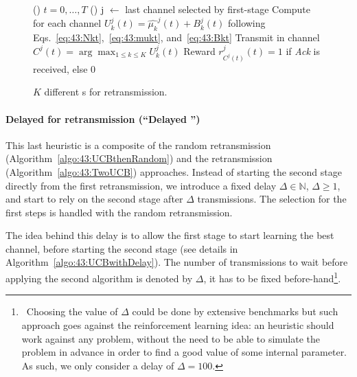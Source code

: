\vspace*{-3pt}
	\begin{figure}[h!]
		\centering
		\begin{algorithm}[H]
			\For()
			{$t = 0, \dots, T$}{
				\Else(){ %
					j $\leftarrow$ last channel selected by first-stage \UCB\;
					Compute for each channel $U_k^j(t) = \widehat{\mu_k}^j(t) + B_k^j(t)$ following Eqs.~\eqref{eq:43:Nkt},~\eqref{eq:43:mukt}, and~\eqref{eq:43:Bkt}\;
					Transmit in channel $C^j(t) = \arg\max_{1\leq k \leq K} U^j_k(t)$\;
					Reward $r^j_{C^j(t)}(t) = 1$ if \emph{Ack} is received, else $0$\;
				}
			}
			\caption{$K$ different {\UCB}s for retransmission.}
			\label{algo:43:UCBthenKp1}
		\end{algorithm}
	\end{figure}

\paragraph{Delayed \UCB{} for retransmission (``Delayed \UCB{}'')}\label{sub:43:UCBwithDelay}

This last heuristic is a composite of
the random retransmission (Algorithm~\ref{algo:43:UCBthenRandom})
and the \UCB{} retransmission (Algorithm~\ref{algo:43:TwoUCB}) approaches.
Instead of starting the second stage \UCB{} directly from the first retransmission, we introduce a fixed delay $\Delta\in\mathbb{N}$, $\Delta \geq 1$,
and start to rely on the second stage \UCB{} after $\Delta$ transmissions.
The selection for the first steps is handled with the random retransmission.

The idea behind this delay is to allow the first stage \UCB{} to start learning the best channel, before starting the second stage \UCB{} (see details in Algorithm~\ref{algo:43:UCBwithDelay}).
The number of transmissions to wait before applying the second algorithm is denoted by $\Delta$, it has to be fixed before-hand\footnote{~Choosing the value of $\Delta$ could be done by extensive benchmarks but such approach goes against the reinforcement learning idea: an heuristic should work against any problem, without the need to be able to simulate the problem in advance in order to find a good value of some internal parameter. As such, we only consider a delay of $\Delta=100$.}.

